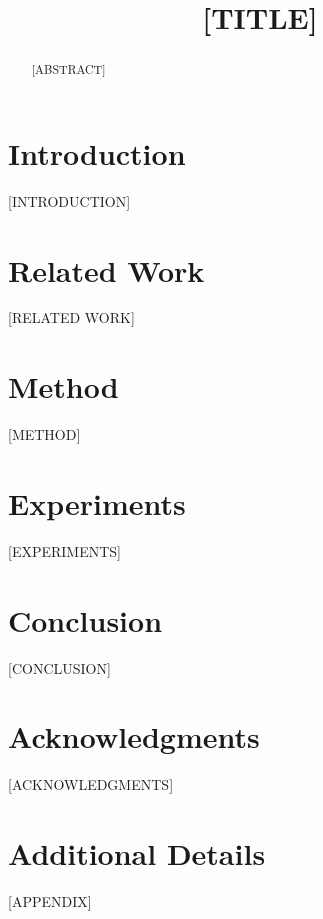 \documentclass[conference]{IEEEtran}
\title{[TITLE]}
\author{
  \IEEEauthorblockN{[AUTHOR 1]}
  \IEEEauthorblockA{[AFFILIATION 1] \\
    \texttt{[EMAIL 1]}}
  \and
  \IEEEauthorblockN{[AUTHOR 2]}
  \IEEEauthorblockA{[AFFILIATION 2] \\
    \texttt{[EMAIL 2]}}
}
\theoremstyle{plain}
\theoremstyle{definition}
\theoremstyle{remark}
\begin{document}
\maketitle

\begin{abstract}
[ABSTRACT]
\end{abstract}

\begin{IEEEkeywords}
[KEYWORDS]
\end{IEEEkeywords}

\section{Introduction}
\label{sec:intro}
[INTRODUCTION]

\section{Related Work}
\label{sec:related}
[RELATED WORK]

\section{Method}
\label{sec:method}
[METHOD]

\section{Experiments}
\label{sec:experiments}
[EXPERIMENTS]

\section{Conclusion}
\label{sec:conclusion}
[CONCLUSION]

\section*{Acknowledgments}
[ACKNOWLEDGMENTS]




\appendix
\section{Additional Details}
[APPENDIX]
\end{document}
